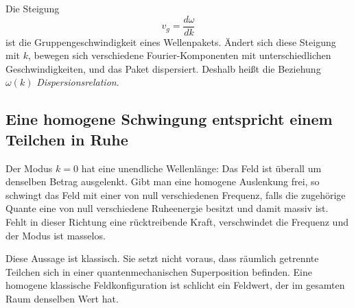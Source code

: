 \begin{classroomqa}
\end{classroomqa}

Die Steigung
\begin{equation}
  v_g=\frac{d\omega}{dk}
\end{equation}
ist die Gruppengeschwindigkeit eines Wellenpakets. Ändert sich diese Steigung mit \(k\), bewegen sich verschiedene Fourier-Komponenten mit unterschiedlichen Geschwindigkeiten, und das Paket dispersiert. Deshalb heißt die Beziehung \(\omega(k)\) \emph{Dispersionsrelation}.

\begin{classroomqa}
\end{classroomqa}

\subsection{Eine homogene Schwingung entspricht einem Teilchen in Ruhe}

Der Modus \(k=0\) hat eine unendliche Wellenlänge: Das Feld ist überall um denselben Betrag ausgelenkt. Gibt man eine homogene Auslenkung frei, so schwingt das Feld mit einer von null verschiedenen Frequenz, falls die zugehörige Quante eine von null verschiedene Ruheenergie besitzt und damit massiv ist. Fehlt in dieser Richtung eine rücktreibende Kraft, verschwindet die Frequenz und der Modus ist masselos.

Diese Aussage ist klassisch. Sie setzt nicht voraus, dass räumlich getrennte Teilchen sich in einer quantenmechanischen Superposition befinden. Eine homogene klassische Feldkonfiguration ist schlicht ein Feldwert, der im gesamten Raum denselben Wert hat.

